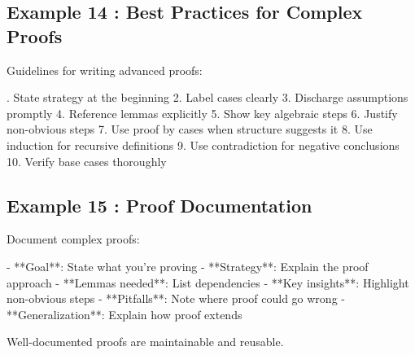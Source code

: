 \documentclass[a4paper,10pt,fleqn]{article}
\begin{document}
\subsection*{Example 14 : Best Practices for Complex Proofs}

\noindent Guidelines for writing advanced proofs:

\bigskip

. State strategy at the beginning 2. Label cases clearly 3. Discharge assumptions promptly 4. Reference lemmas explicitly 5. Show key algebraic steps 6. Justify non-obvious steps 7. Use proof by cases when structure suggests it 8. Use induction for recursive definitions 9. Use contradiction for negative conclusions 10. Verify base cases thoroughly

\bigskip

\subsection*{Example 15 : Proof Documentation}

\noindent Document complex proofs:

\bigskip

\noindent - **Goal**: State what you're proving - **Strategy**: Explain the proof approach - **Lemmas needed**: List dependencies - **Key insights**: Highlight non-obvious steps - **Pitfalls**: Note where proof could go wrong - **Generalization**: Explain how proof extends

\bigskip

\noindent Well-documented proofs are maintainable and reusable.

\bigskip
\end{document}

